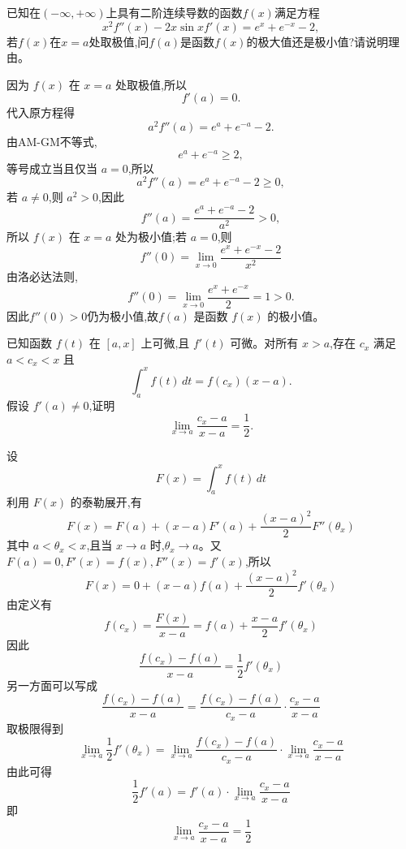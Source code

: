 \begin{questions}
    \question 已知在$(-\infty, +\infty)$上具有二阶连续导数的函数$f(x)$满足方程
    \[
    x^2 f''(x)-2x\sin x f'(x) = e^x + e^{-x}-2,
    \]
    若$f(x)$在$x=a$处取极值,问$f(a)$是函数$f(x)$的极大值还是极小值?请说明理由。
    \begin{solution}
        因为 $f(x)$ 在 $x = a$ 处取极值,所以
        \[
        f'(a) = 0.
        \]
        代入原方程得
        \[
        a^2 f''(a) = e^a + e^{-a} - 2.
        \]
        由AM-GM不等式,
        \[
        e^a + e^{-a} \ge 2,
        \]
        等号成立当且仅当 $a = 0$,所以
        \[
        a^2 f''(a)=e^a + e^{-a} - 2 \ge 0,
        \]
        若 \( a \ne 0 \),则 \( a^2 > 0 \),因此
        \[
        f''(a) = \frac{e^a + e^{-a} - 2}{a^2} > 0,
        \]
        所以 \( f(x) \) 在 \( x = a \) 处为极小值;若 \( a = 0 \),则
        \[
        f''(0) = \lim_{x \to 0} \frac{e^x + e^{-x} - 2}{x^2}
        \]
        由洛必达法则,
        \[
        f''(0) = \lim_{x \to 0} \frac{e^x + e^{-x}}{2} = 1 > 0.
        \]
        因此\( f''(0) > 0 \)仍为极小值,故\( f(a) \) 是函数 \( f(x) \) 的极小值。
    \end{solution}

    \question 已知函数 $f(t)$ 在 $[a,x]$ 上可微,且 $f'(t)$ 可微。对所有 $x > a$,存在 $c_x$ 满足 $a < c_x < x$ 且
    \[
    \int_{a}^{x} f(t) \, dt = f(c_x)(x-a).
    \]
    假设 $f'(a) \neq 0$,证明
    \[
    \lim_{x \to a} \frac{c_x - a}{x-a} = \frac{1}{2}.
    \]
    \begin{solution}
        设
        \[
        F(x) = \int_{a}^{x} f(t) \, dt
        \]
        利用 $F(x)$ 的泰勒展开,有
        \[
        F(x) = F(a) + (x-a)F'(a) + \frac{(x-a)^2}{2} F''(\theta_x)
        \]
        其中 $a<\theta_x<x$,且当 $x \to a$ 时,$\theta_x \to a$。又 $F(a) = 0,F'(x) = f(x),F''(x) = f'(x)$,所以
        \[
        F(x) = 0 + (x-a) f(a) + \frac{(x-a)^2}{2} f'(\theta_x)
        \]
        由定义有
        \[
        f(c_x) = \frac{F(x)}{x-a} = f(a) + \frac{x-a}{2} f'(\theta_x)
        \]
        因此
        \[
        \frac{f(c_x) - f(a)}{x-a} = \frac{1}{2} f'(\theta_x)
        \]
        另一方面可以写成
        \[
        \frac{f(c_x) - f(a)}{x-a} = \frac{f(c_x) - f(a)}{c_x - a} \cdot \frac{c_x - a}{x-a}
        \]
        取极限得到
        \[
        \lim_{x \to a} \frac{1}{2} f'(\theta_x) = \lim_{x \to a} \frac{f(c_x) - f(a)}{c_x - a} \cdot \lim_{x \to a} \frac{c_x - a}{x - a}
        \]
        由此可得
        \[
        \frac{1}{2} f'(a) = f'(a) \cdot \lim_{x \to a} \frac{c_x - a}{x - a}
        \]
        即
        \[
        \lim_{x \to a} \frac{c_x - a}{x - a} = \frac{1}{2}
        \]
    \end{solution}


\end{questions}
